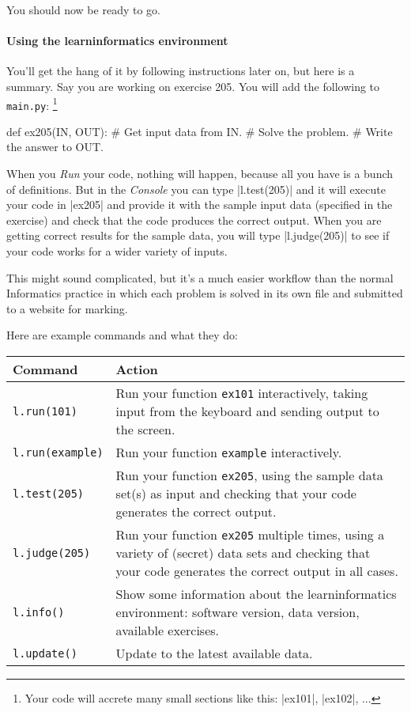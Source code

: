 You should now be ready to go.

\paragraph{Using the learninformatics environment} You'll get the hang of it by following
instructions later on, but here is a summary. Say you are working on exercise 205. You
will add the following to \texttt{main.py}:%
\footnote{Your code will accrete many small sections like this: \pycode|ex101|,
  \pycode|ex102|, ...}
\begin{pythoncode}
  def ex205(IN, OUT):
    # Get input data from IN.
    # Solve the problem.
    # Write the answer to OUT.
\end{pythoncode}

When you \emph{Run} your code, nothing will happen, because all you have is a bunch of
definitions. But in the \emph{Console} you can type \pycode|l.test(205)| and it will
execute your code in \pycode|ex205| and provide it with the sample input data (specified
in the exercise) and check that the code produces the correct output. When you are getting
correct results for the sample data, you will type \pycode|l.judge(205)| to see if your
code works for a wider variety of inputs.

This might sound complicated, but it's a much easier workflow than the normal Informatics
practice in which each problem is solved in its own file and submitted to a website for
marking.

Here are example commands and what they do:
\begin{center}
  \begin{tabular}{lp{10cm}}
    \toprule
    \textbf{Command} & \textbf{Action} \\
    \midrule
    \texttt{l.run(101)}     & Run your function \texttt{ex101} interactively, taking
                              input from the keyboard and sending output to the
                              screen.\\[3pt]
    \texttt{l.run(example)} & Run your function \texttt{example} interactively.\\[3pt]
    \texttt{l.test(205)}    & Run your function \texttt{ex205}, using the sample data
                              set(s) as input and checking that your code generates
                              the correct output.\\[3pt]
    \texttt{l.judge(205)}   & Run your function \texttt{ex205} multiple times, using a
                              variety of (secret) data sets and checking that your code
                              generates the correct output in all cases.\\
    \midrule
    \texttt{l.info()}       & Show some information about the learninformatics
                              environment: software version, data version, available
                              exercises.\\
    \texttt{l.update()}     & Update to the latest available data.\\
    \bottomrule
  \end{tabular}
\end{center}
